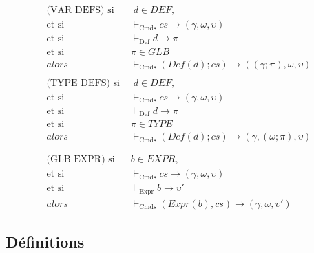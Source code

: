 \documentclass[
  12pt,
]{article}
\begin{document}
\begin{align*}
  \text{(VAR DEFS)  si }        & \; d  \in DEF,                                                               \\
  \text{et si }                 & \vdash_{\text{Cmds}} cs \rightarrow (\gamma,\omega,\upsilon)                 \\
  \text{et si }                 & \vdash_{\text{Def}} d \rightarrow  \pi                                       \\
  \text{et si }                 & \pi \in GLB                                                                  \\
  alors                         & \vdash_{\text{Cmds}} (Def(d); cs) \rightarrow ((\gamma;\pi),\omega,\upsilon) \\
  \\
  \text{(TYPE DEFS)  si }       & \; d  \in DEF,                                                               \\
  \text{et si }                 & \vdash_{\text{Cmds}} cs \rightarrow (\gamma,\omega,\upsilon)                 \\
  \text{et si }                 & \vdash_{\text{Def}} d \rightarrow  \pi                                       \\
  \text{et si }                 & \pi \in TYPE                                                                 \\
  alors                         & \vdash_{\text{Cmds}} (Def(d); cs) \rightarrow (\gamma,(\omega;\pi),\upsilon) \\
  \\
  \\
  \text{(GLB EXPR)} \text{ si } & b  \in EXPR,                                                                 \\
  \text{et si }                 & \vdash_{\text{Cmds}} cs \rightarrow (\gamma,\omega,\upsilon)                 \\
  \text{et si }                 & \vdash_{\text{Expr}} b \rightarrow  \upsilon'                                \\
  alors                         & \vdash_{\text{Cmds}} (Expr(b), cs) \rightarrow  (\gamma,\omega,\upsilon')
\end{align*}

\hypertarget{duxe9finitions}{%
  \subsection{Définitions}\label{duxe9finitions}}
\end{document}
